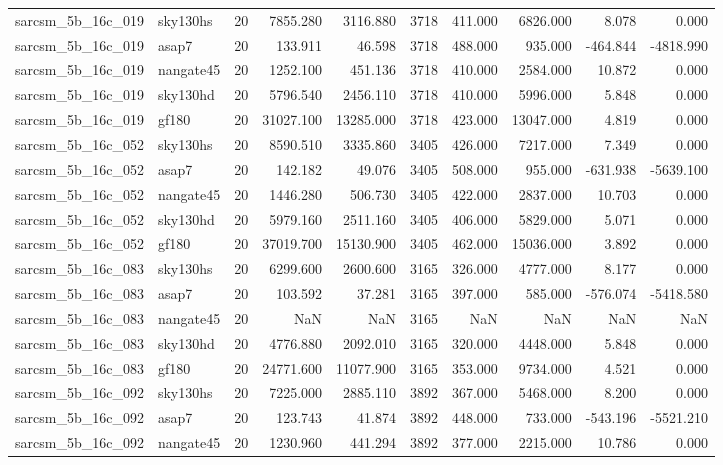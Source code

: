 \documentclass{article}
\begin{document}
\begin{longtable}{llrrrrrrrr}
sarcsm\_5b\_16c\_019 & sky130hs & 20 & 7855.280 & 3116.880 & 3718 & 411.000 & 6826.000 & 8.078 & 0.000 \\
sarcsm\_5b\_16c\_019 & asap7 & 20 & 133.911 & 46.598 & 3718 & 488.000 & 935.000 & -464.844 & -4818.990 \\
sarcsm\_5b\_16c\_019 & nangate45 & 20 & 1252.100 & 451.136 & 3718 & 410.000 & 2584.000 & 10.872 & 0.000 \\
sarcsm\_5b\_16c\_019 & sky130hd & 20 & 5796.540 & 2456.110 & 3718 & 410.000 & 5996.000 & 5.848 & 0.000 \\
sarcsm\_5b\_16c\_019 & gf180 & 20 & 31027.100 & 13285.000 & 3718 & 423.000 & 13047.000 & 4.819 & 0.000 \\
sarcsm\_5b\_16c\_052 & sky130hs & 20 & 8590.510 & 3335.860 & 3405 & 426.000 & 7217.000 & 7.349 & 0.000 \\
sarcsm\_5b\_16c\_052 & asap7 & 20 & 142.182 & 49.076 & 3405 & 508.000 & 955.000 & -631.938 & -5639.100 \\
sarcsm\_5b\_16c\_052 & nangate45 & 20 & 1446.280 & 506.730 & 3405 & 422.000 & 2837.000 & 10.703 & 0.000 \\
sarcsm\_5b\_16c\_052 & sky130hd & 20 & 5979.160 & 2511.160 & 3405 & 406.000 & 5829.000 & 5.071 & 0.000 \\
sarcsm\_5b\_16c\_052 & gf180 & 20 & 37019.700 & 15130.900 & 3405 & 462.000 & 15036.000 & 3.892 & 0.000 \\
sarcsm\_5b\_16c\_083 & sky130hs & 20 & 6299.600 & 2600.600 & 3165 & 326.000 & 4777.000 & 8.177 & 0.000 \\
sarcsm\_5b\_16c\_083 & asap7 & 20 & 103.592 & 37.281 & 3165 & 397.000 & 585.000 & -576.074 & -5418.580 \\
sarcsm\_5b\_16c\_083 & nangate45 & 20 & NaN & NaN & 3165 & NaN & NaN & NaN & NaN \\
sarcsm\_5b\_16c\_083 & sky130hd & 20 & 4776.880 & 2092.010 & 3165 & 320.000 & 4448.000 & 5.848 & 0.000 \\
sarcsm\_5b\_16c\_083 & gf180 & 20 & 24771.600 & 11077.900 & 3165 & 353.000 & 9734.000 & 4.521 & 0.000 \\
sarcsm\_5b\_16c\_092 & sky130hs & 20 & 7225.000 & 2885.110 & 3892 & 367.000 & 5468.000 & 8.200 & 0.000 \\
sarcsm\_5b\_16c\_092 & asap7 & 20 & 123.743 & 41.874 & 3892 & 448.000 & 733.000 & -543.196 & -5521.210 \\
sarcsm\_5b\_16c\_092 & nangate45 & 20 & 1230.960 & 441.294 & 3892 & 377.000 & 2215.000 & 10.786 & 0.000 \\

\end{longtable}
\end{document}
